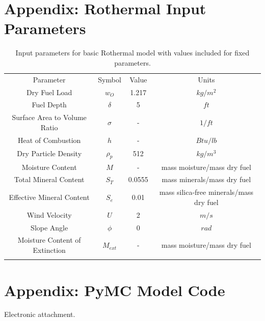 \documentclass[11pt]{article}
\begin{document}
\clearpage
\appendix
\section{Appendix: Rothermal Input Parameters}
\label{ap:table}

\begin{table}[h]
\caption{Input parameters for basic Rothermal model with values included for fixed parameters.}
\begin{center}
  \begin{tabular}{cccc}
    \hline\noalign{\smallskip}
    Parameter & Symbol & Value & Units \\
    \noalign{\smallskip}\hline\noalign{\smallskip}
    Dry Fuel Load & $w_O$ & 1.217 & $kg/m^2$ \\
    Fuel Depth & $\delta$ & 5 & $ft$ \\ 
    Surface Area to Volume Ratio & $\sigma$ & - & $1/ft$ \\ 
    Heat of Combustion & $h$ & - & $Btu/lb$ \\ 
    Dry Particle Density & $\rho_p$ & 512 & $kg/m^3$\\ 
    Moisture Content & $M$ & - & mass moisture/mass dry fuel \\ 
    Total Mineral Content & $S_T$ & 0.0555 & mass minerals/mass dry fuel \\
    Effective Mineral Content & $S_e$ & 0.01 & mass silica-free minerals/mass dry fuel \\
    Wind Velocity & $U$ & 2 & $m/s$ \\
    Slope Angle & $\phi$ & 0 & $rad$ \\
    Moisture Content of Extinction & $M_{ext}$ & - & mass moisture/mass dry fuel \\
    \noalign{\smallskip}\hline
  \end{tabular}
\end{center}
\label{tab:para}
\end{table}

\section{Appendix: PyMC Model Code}

Electronic attachment.

% 
% 
\end{document}
